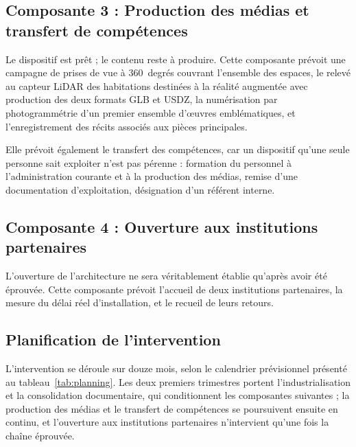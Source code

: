 \subsection{Composante 3 : Production des médias et transfert de compétences}

Le dispositif est prêt ; le contenu reste à produire. Cette composante prévoit
une campagne de prises de vue à 360~degrés couvrant l'ensemble des espaces, le
relevé au capteur LiDAR des habitations destinées à la réalité augmentée avec
production des deux formats GLB et USDZ, la numérisation par photogrammétrie
d'un premier ensemble d'œuvres emblématiques, et l'enregistrement des récits
associés aux pièces principales.

Elle prévoit également le transfert des compétences, car un dispositif qu'une
seule personne sait exploiter n'est pas pérenne : formation du personnel à
l'administration courante et à la production des médias, remise d'une
documentation d'exploitation, désignation d'un référent interne.

\subsection{Composante 4 : Ouverture aux institutions partenaires}

L'ouverture de l'architecture ne sera véritablement établie qu'après avoir été
éprouvée. Cette composante prévoit l'accueil de deux institutions partenaires,
la mesure du délai réel d'installation, et le recueil de leurs retours.

\subsection{Planification de l'intervention}

L'intervention se déroule sur douze mois, selon le calendrier prévisionnel
présenté au tableau~\ref{tab:planning}. Les deux
premiers trimestres portent l'industrialisation et la consolidation
documentaire, qui conditionnent les composantes suivantes ; la production des
médias et le transfert de compétences se poursuivent ensuite en continu, et
l'ouverture aux institutions partenaires n'intervient qu'une fois la chaîne
éprouvée.

